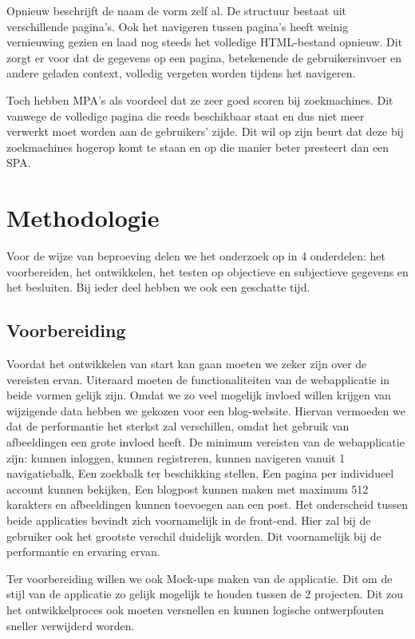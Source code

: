 \documentclass{hogent-article}
\begin{document}
Opnieuw beschrijft de naam de vorm zelf al.
De structuur bestaat uit verschillende pagina's.
Ook het navigeren tussen pagina's heeft weinig vernieuwing gezien en laad nog steeds het volledige HTML-bestand opnieuw.
Dit zorgt er voor dat de gegevens op een pagina, betekenende de gebruikersinvoer en andere geladen context, volledig vergeten worden tijdens het navigeren.

Toch hebben MPA's als voordeel dat ze zeer goed scoren bij zoekmachines.
Dit vanwege de volledige pagina die reeds beschikbaar staat en dus niet meer verwerkt moet worden aan de gebruikers' zijde.
Dit wil op zijn beurt dat deze bij zoekmachines hogerop komt te staan en op die manier beter presteert dan een SPA.


\section{Methodologie}
Voor de wijze van beproeving delen we het onderzoek op in 4 onderdelen: het voorbereiden, het ontwikkelen, het testen op objectieve en subjectieve gegevens en het besluiten.
Bij ieder deel hebben we ook een geschatte tijd.

\subsection{Voorbereiding}
Voordat het ontwikkelen van start kan gaan moeten we zeker zijn over de vereisten ervan.
Uiteraard moeten de functionaliteiten van de webapplicatie in beide vormen gelijk zijn.
Omdat we zo veel mogelijk invloed willen krijgen van wijzigende data hebben we gekozen voor een blog-website.
Hiervan vermoeden we dat de performantie het sterkst zal verschillen, omdat het gebruik van afbeeldingen een grote invloed heeft.
De minimum vereisten van de webapplicatie zijn:
kunnen inloggen,
kunnen registreren,
kunnen navigeren vanuit 1 navigatiebalk,
Een zoekbalk ter beschikking stellen,
Een pagina per individueel account kunnen bekijken,
Een blogpost kunnen maken met maximum 512 karakters
en afbeeldingen kunnen toevoegen aan een post.
Het onderscheid tussen beide applicaties bevindt zich voornamelijk in de front-end.
Hier zal bij de gebruiker ook het grootste verschil duidelijk worden.
Dit voornamelijk bij de performantie en ervaring ervan.

Ter voorbereiding willen we ook Mock-ups maken van de applicatie.
Dit om de stijl van de applicatie zo gelijk mogelijk te houden tussen de 2 projecten.
Dit zou het ontwikkelproces ook moeten versnellen en kunnen logische ontwerpfouten sneller verwijderd worden.
\end{document}
